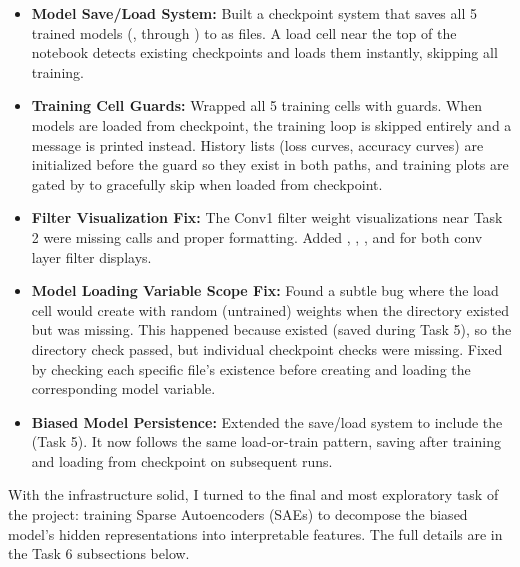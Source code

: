 \documentclass[9pt,a4paper,twocolumn,twoside]{tau-class/tau}
\begin{document}
        \begin{itemize}
            \item \textbf{Model Save/Load System:} Built a checkpoint system that saves all 5 trained models (,  through ) to  as  files. A load cell near the top of the notebook detects existing checkpoints and loads them instantly, skipping all training.

            \item \textbf{Training Cell Guards:} Wrapped all 5 training cells with  guards. When models are loaded from checkpoint, the training loop is skipped entirely and a message is printed instead. History lists (loss curves, accuracy curves) are initialized before the guard so they exist in both paths, and training plots are gated by  to gracefully skip when loaded from checkpoint.

            \item \textbf{Filter Visualization Fix:} The Conv1 filter weight visualizations near Task 2 were missing  calls and proper formatting. Added , , , and  for both conv layer filter displays.

            \item \textbf{Model Loading Variable Scope Fix:} Found a subtle bug where the load cell would create  with random (untrained) weights when the  directory existed but  was missing. This happened because  existed (saved during Task 5), so the directory check passed, but individual checkpoint checks were missing. Fixed by checking each specific  file's existence before creating and loading the corresponding model variable.

            \item \textbf{Biased Model Persistence:} Extended the save/load system to include the  (Task 5). It now follows the same load-or-train pattern, saving after training and loading from checkpoint on subsequent runs.
        \end{itemize}

        With the infrastructure solid, I turned to the final and most exploratory task of the project: training Sparse Autoencoders (SAEs) to decompose the biased model's hidden representations into interpretable features. The full details are in the Task 6 subsections below.
\end{document}
